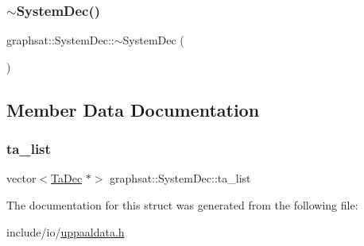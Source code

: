 \subsubsection{\texorpdfstring{$\sim$SystemDec()}{~SystemDec()}}
{\footnotesize\ttfamily graphsat\+::\+System\+Dec\+::$\sim$\+System\+Dec (\begin{DoxyParamCaption}{ }\end{DoxyParamCaption})\hspace{0.3cm}{\ttfamily [inline]}}



\subsection{Member Data Documentation}
\mbox{\label{structgraphsat_1_1_system_dec_a5623ebdca148d6573e9567b04d42102b}} 
\subsubsection{\texorpdfstring{ta\_list}{ta\_list}}
{\footnotesize\ttfamily vector$<$\mbox{\hyperlink{structgraphsat_1_1_ta_dec}{Ta\+Dec}} $\ast$$>$ graphsat\+::\+System\+Dec\+::ta\+\_\+list}



The documentation for this struct was generated from the following file\+:\begin{DoxyCompactItemize}
\item 
include/io/\mbox{\hyperlink{uppaaldata_8h}{uppaaldata.\+h}}\end{DoxyCompactItemize}
